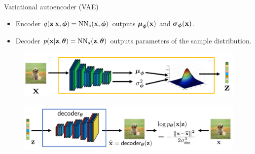\begin{frame}{Variational autoencoder (VAE)}
	\begin{itemize}
		\item Encoder $q(\mathbf{z} | \mathbf{x}, \boldsymbol{\phi}) = \text{NN}_e(\mathbf{x}, \boldsymbol{\phi})$ outputs $\boldsymbol{\mu}_{\boldsymbol{\phi}}(\mathbf{x})$ and $\boldsymbol{\sigma}_{\boldsymbol{\phi}}(\mathbf{x})$.
		\item Decoder $p(\mathbf{x} | \mathbf{z}, \boldsymbol{\theta}) = \text{NN}_d(\mathbf{z}, \boldsymbol{\theta})$ outputs parameters of the sample distribution.
	\end{itemize}
	\begin{figure}[h]
		\centering
		\includegraphics[width=0.7\linewidth]{figs/vae-encoder}
	\end{figure}
	\begin{figure}[h]
		\centering
		\includegraphics[width=0.9\linewidth]{figs/vae-decoder}
	\end{figure}
	
\end{frame}
